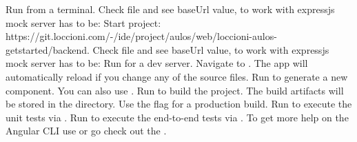 {}\markdownRendererInterblockSeparator
{}Run  from a terminal.\markdownRendererInterblockSeparator
{}Check  file and see baseUrl value, to work with expressjs mock server has to be: \markdownRendererInterblockSeparator
{}\markdownRendererInterblockSeparator
{}Start project: https://git.loccioni.com/-/ide/project/aulos/web/loccioni-aulos-getstarted/backend.\markdownRendererInterblockSeparator
{}Check  file and see baseUrl value, to work with expressjs mock server has to be: \markdownRendererInterblockSeparator
{}\markdownRendererInterblockSeparator
{}Run  for a dev server. Navigate to . The app will automatically reload if you change any of the source files.\markdownRendererInterblockSeparator
{}\markdownRendererInterblockSeparator
{}Run  to generate a new component. You can also use .\markdownRendererInterblockSeparator
{}\markdownRendererInterblockSeparator
{}Run  to build the project. The build artifacts will be stored in the  directory. Use the  flag for a production build.\markdownRendererInterblockSeparator
{}\markdownRendererInterblockSeparator
{}Run  to execute the unit tests via .\markdownRendererInterblockSeparator
{}\markdownRendererInterblockSeparator
{}Run  to execute the end-to-end tests via .\markdownRendererInterblockSeparator
{}\markdownRendererInterblockSeparator
{}To get more help on the Angular CLI use  or go check out the .\markdownRendererInterblockSeparator
{}\markdownRendererHeadingOne{}\relax